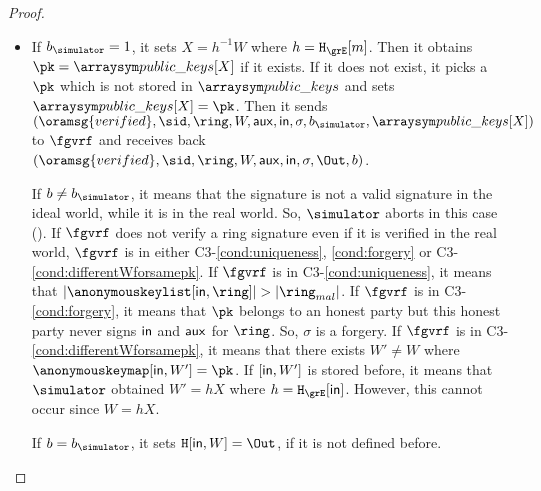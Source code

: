 \begin{proof}
\begin{itemize}
		\begin{itemize}
			\item 		If $ b_\simulator = 1 $, it sets $ X = h^{-1} W$ where $ h = \mathtt{\hashG}[m] $. Then it obtains $ \pk  = \pkeys[X]$ if it exists. If it does not exist, it picks a $ \pk  $ which is not stored in $ \pkeys $ and sets $ \pkeys[X] = \pk $. Then it sends  $ (\oramsg{verified}, \sid, \ring, W,\aux,\msg, \sigma, b_\simulator, \pkeys[X]) $ to $ \fgvrf $ and receives back $ (\oramsg{verified}, \sid, \ring, W, \aux, \msg, \sigma, \Out, b) $. 
			
			 If $ b \neq b_\simulator $, it means that the signature is not a valid signature in the ideal world, while it is in the real world. So, $ \simulator $ aborts in this case ().
				If $ \fgvrf $ does not verify a ring signature even if  it is verified in the real world, $ \fgvrf $ is in either C3-\ref{cond:uniqueness}, \ref{cond:forgery} or C3-\ref{cond:differentWforsamepk}.
				If $ \fgvrf $ is in C3-\ref{cond:uniqueness}, it means that $ |\anonymouskeylist[\msg,\ring]|> |\ring_{mal}| $. If $ \fgvrf $ is in C3-\ref{cond:forgery}, it means that $ \pk$ belongs to an honest party but this honest party never signs $ \mathsf{in} $ and $ \mathsf{aux} $ for  $ \ring $. So, $ \sigma $ is a forgery.	 If $ \fgvrf $ is in C3- \ref{cond:differentWforsamepk}, it means that there exists $ W' \neq W $ where $ \anonymouskeymap[\msg,W'] = \pk$. If $ [\mathsf{in},W'] $ is stored before, it means that $ \simulator $ obtained $ W' = hX $ where $ h =\mathtt{\hashG}[\msg] $.  However, this cannot occur since $ W = hX $.
			
				 If $ b = b_\simulator $, it sets $\mathtt{\hash}[\msg,W] = \Out $, if it is not defined before.
				


\end{itemize}
\end{itemize}
\end{proof}
